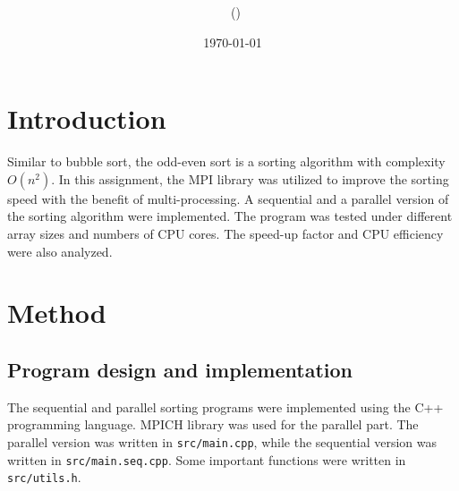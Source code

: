 \documentclass[twoside,12pt]{article}
\title{{\lms \Code \ \Ass}}
\author{\lms \name \ (\href{mailto:\mail}{\mail})}
\date{\sffamily \today}
\makeatletter
\theoremstyle{definition}
\theoremstyle{remark}
\renewcommand{\maketitle}{\bgroup\setlength{\parindent}{0pt}
\begin{flushleft}
  \textbf{\Large\@title}

  \@author
\end{flushleft}\egroup
}
\makeatother
\begin{document}
\maketitle
\thispagestyle{title}

\section{Introduction}
Similar to bubble sort, the odd-even sort is a sorting algorithm with complexity $O(n^2)$.
In this assignment, the MPI library was utilized to improve the
sorting speed with the benefit of multi-processing.
A sequential and a parallel version of the sorting algorithm were implemented.
The program was tested under different array sizes and numbers of CPU cores.
The speed-up factor and CPU efficiency were also analyzed.



\section{Method}
\subsection{Program design and implementation}
The sequential and parallel sorting programs were implemented using the C++ programming language.
MPICH library was used for the parallel part.
The parallel version was written in \lstinline|src/main.cpp|, 
while the sequential version was written in \lstinline|src/main.seq.cpp|.
Some important functions were written in \lstinline|src/utils.h|.
\end{document}
